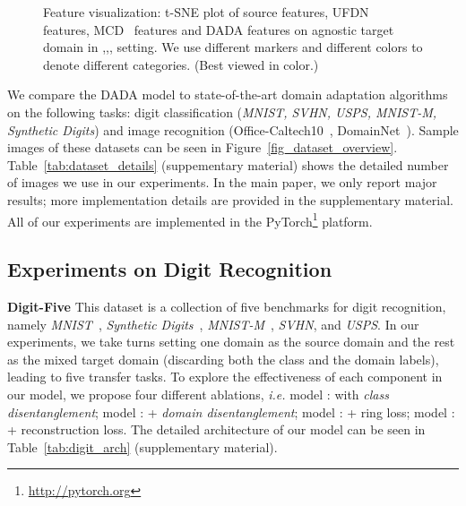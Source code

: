 \documentclass{article}
\newcommand{\BV}[1]{\color{black!10!blue}{\em #1}}
\begin{document}
\begin{figure*}[t]
    \begin{minipage}{\hsize}
      \centering
     \centering
      \centering
      \centering
    \end{minipage}
    \vspace{-0.4cm}
  \caption{Feature visualization: t-SNE plot of source features, UFDN~\cite{ufdn} features, MCD~\cite{MCD_2018} features and DADA features on agnostic target domain in {\BV{sv}} {\BV{mm},\BV{mt},\BV{up},\BV{sy}} setting. We use different markers and different colors to denote different categories. (Best viewed in color.)}
  \label{fig_analysis}
  
\end{figure*} 

We compare the DADA model to state-of-the-art domain adaptation algorithms on the following tasks: digit classification (\textit{MNIST, SVHN, USPS, MNIST-M, Synthetic Digits}) and image recognition (Office-Caltech10~\cite{gong2012geodesic}, DomainNet~\cite{domainnet}). Sample images of these datasets can be seen in Figure~\ref{fig_dataset_overview}. Table~\ref{tab:dataset_details} (suppementary material) shows the detailed number of images we use in our experiments. In the main paper, we only report major results; more implementation details are provided in the supplementary material. All of our experiments are implemented in the PyTorch\footnote{\url{http://pytorch.org}} platform. 

\vspace{-0.3cm}
\subsection{Experiments on Digit Recognition}
\label{exp_digit}
\textbf{Digit-Five} This dataset is a collection of five benchmarks for digit recognition, namely \textit{MNIST}~\cite{lecun1998gradient}, \textit{Synthetic Digits}~\cite{DANN}, \textit{MNIST-M}~\cite{DANN}, \textit{SVHN}, and \textit{USPS}. In our experiments, we take turns setting one domain as the source domain and the rest as the mixed target domain (discarding both the class and the domain labels), leading to five transfer tasks. To explore the effectiveness of each component in our model, we propose four different ablations, \textit{i.e.} model \textbf{}: with \textit{class disentanglement}; model \textbf{}: \textbf{} + \textit{domain disentanglement}; model \textbf{}: \textbf{} + ring loss; model \textbf{}: \textbf{} + reconstruction loss. The detailed architecture of our model can be seen in Table~\ref{tab:digit_arch} (supplementary material).
\end{document}
